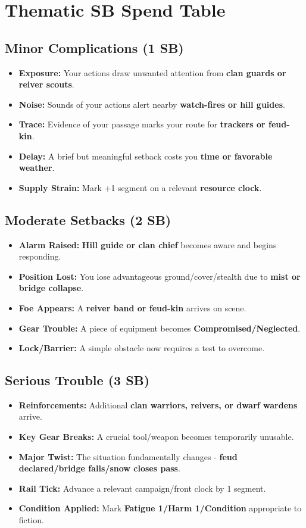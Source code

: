 \section*{Thematic SB Spend Table}
\label{sec:ubral-sb}

\subsection*{Minor Complications (1 SB)}
\begin{itemize}
\item \textbf{Exposure:} Your actions draw unwanted attention from \textbf{clan guards or reiver scouts}.
\item \textbf{Noise:} Sounds of your actions alert nearby \textbf{watch-fires or hill guides}.
\item \textbf{Trace:} Evidence of your passage marks your route for \textbf{trackers or feud-kin}.
\item \textbf{Delay:} A brief but meaningful setback costs you \textbf{time or favorable weather}.
\item \textbf{Supply Strain:} Mark +1 segment on a relevant \textbf{resource clock}.
\end{itemize}

\subsection*{Moderate Setbacks (2 SB)}
\begin{itemize}
\item \textbf{Alarm Raised:} \textbf{Hill guide or clan chief} becomes aware and begins responding.
\item \textbf{Position Lost:} You lose advantageous ground/cover/stealth due to \textbf{mist or bridge collapse}.
\item \textbf{Foe Appears:} A \textbf{reiver band or feud-kin} arrives on scene.
\item \textbf{Gear Trouble:} A piece of equipment becomes \textbf{Compromised/Neglected}.
\item \textbf{Lock/Barrier:} A simple obstacle now requires a test to overcome.
\end{itemize}

\subsection*{Serious Trouble (3 SB)}
\begin{itemize}
\item \textbf{Reinforcements:} Additional \textbf{clan warriors, reivers, or dwarf wardens} arrive.
\item \textbf{Key Gear Breaks:} A crucial tool/weapon becomes temporarily unusable.
\item \textbf{Major Twist:} The situation fundamentally changes - \textbf{feud declared/bridge falls/snow closes pass}.
\item \textbf{Rail Tick:} Advance a relevant campaign/front clock by 1 segment.
\item \textbf{Condition Applied:} Mark \textbf{Fatigue 1/Harm 1/Condition} appropriate to fiction.
\end{itemize}

